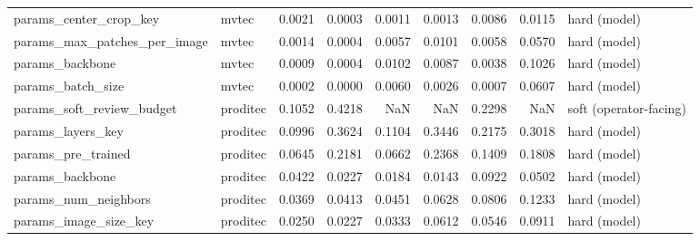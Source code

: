 \begin{tabular}{llrrrrrrl}
       params\_center\_crop\_key &    mvtec &              0.0021 &            0.0003 &                        0.0011 &                      0.0013 &           0.0086 &                     0.0115 &           hard (model) \\
 params\_max\_patches\_per\_image &    mvtec &              0.0014 &            0.0004 &                        0.0057 &                      0.0101 &           0.0058 &                     0.0570 &           hard (model) \\
              params\_backbone &    mvtec &              0.0009 &            0.0004 &                        0.0102 &                      0.0087 &           0.0038 &                     0.1026 &           hard (model) \\
            params\_batch\_size &    mvtec &              0.0002 &            0.0000 &                        0.0060 &                      0.0026 &           0.0007 &                     0.0607 &           hard (model) \\
    params\_soft\_review\_budget & proditec &              0.1052 &            0.4218 &                           NaN &                         NaN &           0.2298 &                        NaN & soft (operator-facing) \\
            params\_layers\_key & proditec &              0.0996 &            0.3624 &                        0.1104 &                      0.3446 &           0.2175 &                     0.3018 &           hard (model) \\
           params\_pre\_trained & proditec &              0.0645 &            0.2181 &                        0.0662 &                      0.2368 &           0.1409 &                     0.1808 &           hard (model) \\
              params\_backbone & proditec &              0.0422 &            0.0227 &                        0.0184 &                      0.0143 &           0.0922 &                     0.0502 &           hard (model) \\
         params\_num\_neighbors & proditec &              0.0369 &            0.0413 &                        0.0451 &                      0.0628 &           0.0806 &                     0.1233 &           hard (model) \\
        params\_image\_size\_key & proditec &              0.0250 &            0.0227 &                        0.0333 &                      0.0612 &           0.0546 &                     0.0911 &           hard (model) \\

\end{tabular}

